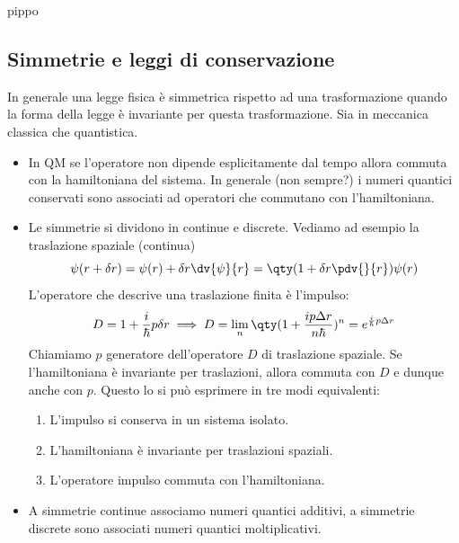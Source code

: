 pippo
\subsection{Simmetrie e leggi di conservazione}
In generale una legge fisica è simmetrica rispetto ad una trasformazione quando la forma della legge è invariante per questa trasformazione. Sia in meccanica classica che quantistica. 
\begin{itemize}
    \item In QM se l'operatore non dipende esplicitamente dal tempo allora commuta con la hamiltoniana del sistema. In generale (non sempre?) i numeri quantici conservati sono associati ad operatori che commutano con l'hamiltoniana.
    \item Le simmetrie si dividono in continue e discrete. Vediamo ad esempio la traslazione spaziale (continua)
    \begin{equation*}
        \psi(r+\delta r)=\psi(r)+\delta r \dv{\psi}{r}=\qty(1+\delta r \pdv{}{r})\psi(r)
    \end{equation*}
    L'operatore che descrive una traslazione finita è l'impulso:
    \begin{equation*}
        D=1+\frac i\hbar p\delta r\implies D=\lim_n\qty(1+\frac {ip\Delta r}{n\hbar})^n=e^{\frac i\hbar p\Delta r}
    \end{equation*}
    Chiamiamo $p$ generatore dell'operatore $D$ di traslazione spaziale. Se l'hamiltoniana è invariante per traslazioni, allora commuta con $D$ e dunque anche con $p$. Questo lo si può esprimere in tre modi equivalenti:
    \begin{enumerate}
        \item L'impulso si conserva in un sistema isolato.
        \item L'hamiltoniana è invariante per traslazioni spaziali.
        \item L'operatore impulso commuta con l'hamiltoniana.
    \end{enumerate}
    \item A simmetrie continue associamo numeri quantici additivi, a simmetrie discrete sono associati numeri quantici moltiplicativi.
\end{itemize}
